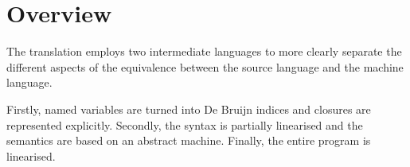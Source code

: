 \section*{Overview}

The translation employs two intermediate languages to more clearly separate the different aspects of the equivalence between the source language and the machine language.

Firstly, named variables are turned into De Bruijn indices and closures are represented explicitly.
Secondly, the syntax is partially linearised and the semantics are based on an abstract machine.
Finally, the entire program is linearised.